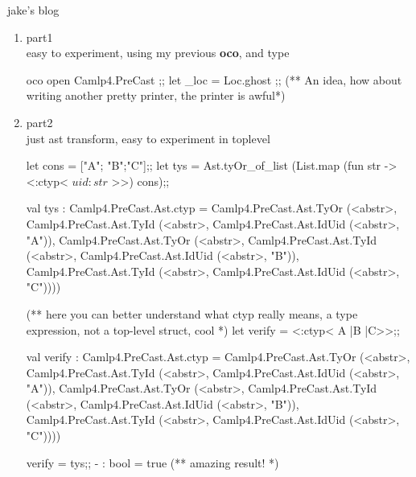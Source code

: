 \item jake's blog
  \begin{enumerate}
  \item part1 \\
    easy to experiment, using my previous {\bf oco},
    and type

    \begin{bluecode}
oco       
open Camlp4.PreCast ;;
let _loc = Loc.ghost ;;
(** An idea, how about writing another pretty printer, the printer is awful*)
\end{bluecode}

\item part2 \\ 
  just ast transform, easy to experiment in toplevel
  

\begin{redcode}
let cons = ["A"; "B";"C"];;
let tys = Ast.tyOr_of_list (List.map (fun str -> <:ctyp< $uid:str$ >>) cons);;
\end{redcode}

\begin{bluecode}
val tys : Camlp4.PreCast.Ast.ctyp =
  Camlp4.PreCast.Ast.TyOr (<abstr>,
   Camlp4.PreCast.Ast.TyId (<abstr>, Camlp4.PreCast.Ast.IdUid (<abstr>, "A")),
   Camlp4.PreCast.Ast.TyOr (<abstr>,
    Camlp4.PreCast.Ast.TyId (<abstr>,
     Camlp4.PreCast.Ast.IdUid (<abstr>, "B")),
    Camlp4.PreCast.Ast.TyId (<abstr>,
     Camlp4.PreCast.Ast.IdUid (<abstr>, "C"))))
\end{bluecode}
   
\begin{redcode}
(** here you can better understand what ctyp really means, a type
expression, not a top-level struct, cool 
*)
let verify = <:ctyp< A |B |C>>;;
\end{redcode}

\begin{bluecode}
val verify : Camlp4.PreCast.Ast.ctyp =
  Camlp4.PreCast.Ast.TyOr (<abstr>,
   Camlp4.PreCast.Ast.TyId (<abstr>, Camlp4.PreCast.Ast.IdUid (<abstr>, "A")),
   Camlp4.PreCast.Ast.TyOr (<abstr>,
    Camlp4.PreCast.Ast.TyId (<abstr>,
     Camlp4.PreCast.Ast.IdUid (<abstr>, "B")),
    Camlp4.PreCast.Ast.TyId (<abstr>,
     Camlp4.PreCast.Ast.IdUid (<abstr>, "C"))))
   \end{bluecode}

\begin{alternate}   
verify = tys;;
- : bool = true (** amazing result! *)
\end{alternate}


\end{enumerate}

